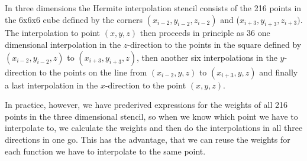 \documentclass[useAMS,usenatbib]{iopart}
\begin{document}
In three dimensions the Hermite interpolation stencil consists of the 216
points in the 6x6x6 cube defined by the corners $(x_{i-2},y_{i-2},z_{i-2})$ and
($x_{i+3},y_{i+3},z_{i+3})$. The interpolation to point $(x,y,z)$ then
proceeds in principle as 36 one dimensional interpolation in the $z$-direction
to the points in the square defined by $(x_{i-2},y_{i-2},z)$ to
$(x_{i+3},y_{i+3},z)$, then another six interpolations in the $y$-direction
to the points on the line from $(x_{i-2},y,z)$ to $(x_{i+3},y,z)$ and
finally a last interpolation in the $x$-direction to the point $(x,y,z)$.

In practice, however, we have prederived expressions for the weights of
all 216 points in the three dimensional stencil, so when we know which
point we have to interpolate to, we calculate the weights and
then do the interpolations in all three directions in one go. This has
the advantage, that we can reuse the weights for each function we have
to interpolate to the same point.
\end{document}
